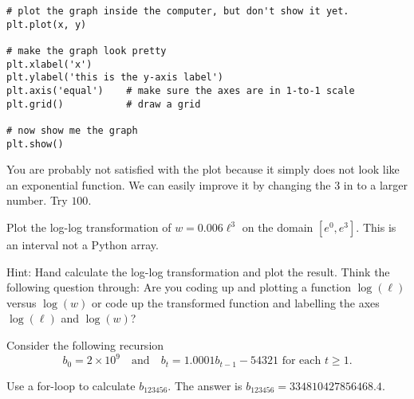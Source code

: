 \documentclass[../main.tex]{subfiles}
\begin{document}
\begin{enumerate}
\begin{verbatim}
# plot the graph inside the computer, but don't show it yet.
plt.plot(x, y)

# make the graph look pretty
plt.xlabel('x')
plt.ylabel('this is the y-axis label')
plt.axis('equal')    # make sure the axes are in 1-to-1 scale
plt.grid()           # draw a grid

# now show me the graph
plt.show()
    \end{verbatim}

    You are probably not satisfied with the plot because it simply does not look like an exponential function.  We can easily improve it by changing the \(3\) in  to a larger number. Try \(100\). 

\end{enumerate}


\begin{example}
  Plot the log-log transformation of \(w = 0.006 \ell^{3}\) on the domain \([e^{0}, e^{3}]\). This is an interval not a Python array.

  Hint: Hand calculate the log-log transformation and plot the result.  Think the following question through: Are you coding up and plotting a function \(\log(\ell)\) versus \(\log(w)\) or code up the transformed function and labelling the axes \(\log(\ell)\) and \(\log(w)\)?

\end{example}


\begin{example}
  Consider the following recursion
  \[
    b_{0} = 2 \times 10^{9} \quad\text{and}\quad b_{t} = 1.0001 b_{t-1} - 54321 \text{ for each } t \ge 1.
  \]

  Use a for-loop to calculate \(b_{123456}\).  The answer is \(b_{123456} = 334810427856468.4\).
\end{example}
\clearpage
\end{document}
